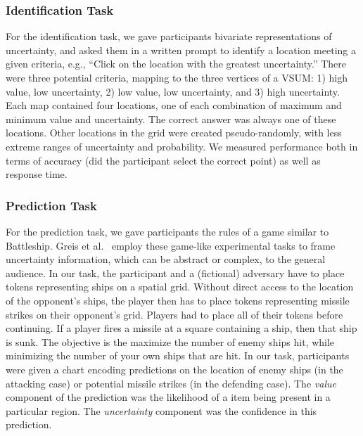 \documentclass{vgtc}                          %
\begin{document}
\subsubsection{Identification Task}

For the identification task, we gave participants bivariate representations of uncertainty, and asked them in a written prompt to identify a location meeting a given criteria, e.g., ``Click on the location with the greatest uncertainty.'' There were three potential criteria, mapping to the three vertices of a VSUM: 1) high value, low uncertainty, 2) low value, low uncertainty, and 3) high uncertainty. Each map contained four locations, one of each combination of maximum and minimum value and uncertainty. The correct answer was always one of these locations. Other locations in the grid were created pseudo-randomly, with less extreme ranges of uncertainty and probability. We measured performance both in terms of accuracy (did the participant select the correct point) as well as response time.

\subsubsection{Prediction Task}

\taskTwoFig

For the prediction task, we gave participants the rules of a game similar to Battleship. Greis et al.~\cite{greis2016decision} employ these game-like experimental tasks to frame uncertainty information, which can be abstract or complex, to the general audience. In our task, the participant and a (fictional) adversary have to place tokens representing ships on a spatial grid. Without direct access to the location of the opponent's ships, the player then has to place tokens representing missile strikes on their opponent's grid. Players had to place all of their tokens before continuing. If a player fires a missile at a square containing a ship, then that ship is sunk. The objective is the maximize the number of enemy ships hit, while minimizing the number of your own ships that are hit. In our task, participants were given a chart encoding predictions on the location of enemy ships (in the attacking case) or potential missile strikes (in the defending case). The \emph{value} component of the prediction was the likelihood of a item being present in a particular region. The \emph{uncertainty} component was the confidence in this prediction.
\end{document}
